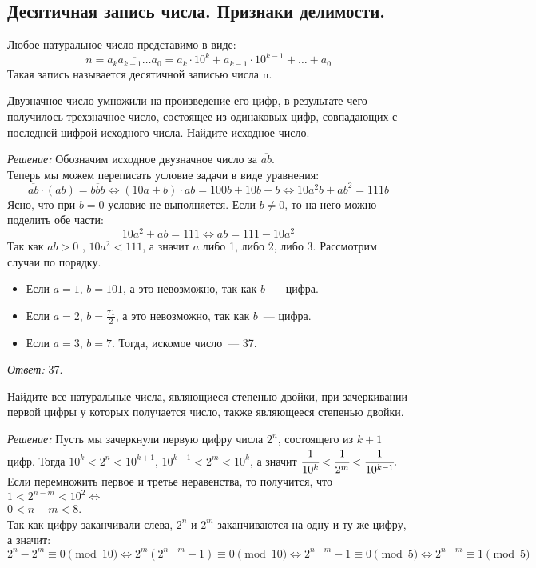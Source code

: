 \documentclass[11pt]{article}
\begin{document}
\subsection{Десятичная запись числа. Признаки делимости.}

\begin{definition}
    Любое натуральное число представимо в виде:
\[ n = \overline{a_{k}a_{k - 1}\ldots a_0} = a_k \cdot 10^k + a_{k - 1} \cdot 10^{k -1} + \ldots + a_0 \]
Такая запись называется десятичной записью числа n.
\end{definition}

\begin{example}
	Двузначное число умножили на произведение его цифр, в результате чего получилось трехзначное число, состоящее из одинаковых цифр, совпадающих с последней цифрой исходного числа. Найдите исходное число.
\end{example}
\textit{Решение:}
Обозначим исходное двузначное число за $\overline{ab}$.\\
Теперь мы можем переписать условие задачи в виде уравнения:
\[ \overline{ab} \cdot (ab) = \overline{bbb} \Leftrightarrow
(10a + b) \cdot ab = 100b + 10b + b \Leftrightarrow
10a^2b + ab^2 = 111b \]
Ясно, что при $b = 0$ условие не выполняется. Если $b \neq 0$, то на него можно поделить обе части:
\[10a^2 + ab = 111 \Leftrightarrow ab = 111 - 10a^2\]
Так как $ab > 0$ , $10a^2 < 111$, а значит $a$ либо 1, либо 2, либо 3. Рассмотрим случаи по порядку.
\begin{itemize}
	\item Если $a = 1$, $b = 101$, а это невозможно, так как $b$~--- цифра.
	\item Если $a = 2$, $b = \frac{71}{2}$, а это невозможно, так как $b$~--- цифра.
	\item Если $a = 3$, $b = 7$. Тогда, искомое число~--- 37.
\end{itemize}
\textit{Ответ:} 37.

\begin{example}
	Найдите все натуральные числа, являющиеся степенью двойки, при зачеркивании первой цифры у которых получается число, также являющееся степенью двойки.
\end{example}
\textit{Решение:}
Пусть мы зачеркнули первую цифру числа $2^n$, состоящего из $k + 1$ цифр. Тогда  $10^k < 2^n < 10^{k + 1}$, $10^{k - 1} < 2^m < 10^k$, а значит $\cfrac{1}{10^k} < \cfrac{1}{2^m} < \cfrac{1}{10^{k - 1}}.$\\
Если перемножить первое и третье неравенства, то получится, что $1 < 2^{n - m} < 10^{2} \Longleftrightarrow$\\ $0 < n - m < 8$.\\
Так как цифру заканчивали слева, $2^n$ и $2^m$ заканчиваются на одну и ту же цифру, а значит:\\
\[2^n - 2^m \equiv 0 \pmod{10} \Leftrightarrow 2^m(2^{n - m} - 1) \equiv 0 \pmod{10} \Leftrightarrow
2^{n - m} - 1 \equiv 0 \pmod 5 \Leftrightarrow 2^{n - m} \equiv 1 \pmod 5 \]
\end{document}
